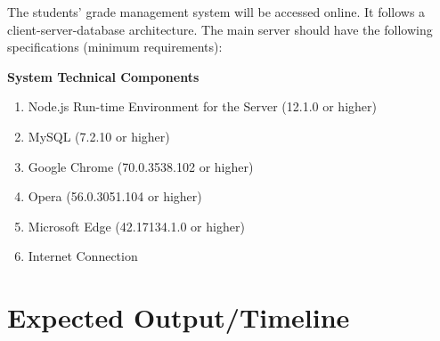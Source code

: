 \documentclass[11pt,a4paper,titlepage]{article}
\let\stdsection\section
\renewcommand\section{\newpage\stdsection}
\begin{document}
The students' grade management system will be accessed online. It follows a client-server-database architecture. The main server should have the following specifications (minimum requirements):

\vspace{1cm}

\textbf{System Technical Components}

\begin{enumerate}
    \item Node.js Run-time Environment for the Server (12.1.0 or higher)
    \item MySQL (7.2.10 or higher)
    \item Google Chrome (70.0.3538.102 or higher)
    \item Opera (56.0.3051.104 or higher)
    \item Microsoft Edge (42.17134.1.0 or higher)
    \item Internet Connection
\end{enumerate}






\section{Expected Output/Timeline}

\clearpage


\end{document}
